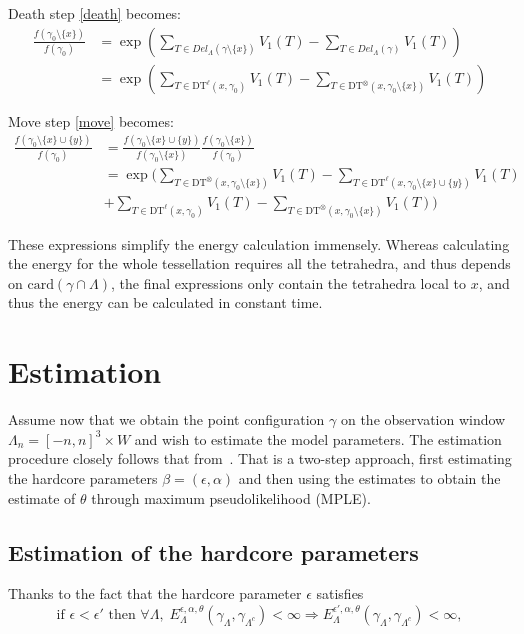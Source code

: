 \documentclass[12pt,a4paper]{report}
\begin{document}
Death step \ref{death} becomes:
\begin{align*}
\frac{f(\gamma_0 \setminus \{x\})}{f(\gamma_0)}&= \exp\left({\sum_{T\in Del_\Lambda(\gamma \setminus \{x\})} V_1(T)- \sum_{T \in Del_\Lambda(\gamma)}V_1(T)}\right)\\
&= \exp\left( \sum_{T\in \text{DT}^\ell (x,\gamma_0)} V_1(T) - \sum_{T \in \text{DT}^\otimes (x,\gamma_0 \setminus \{x\})} V_1(T)   \right)
\end{align*}

Move step \ref{move} becomes:
\begin{align*}
\frac{f(\gamma_0 \setminus \{x\} \cup \{y\})}{f(\gamma_0)}&= 
\frac{f(\gamma_0 \setminus \{x\} \cup \{y\})}{f(\gamma_0\setminus\{x\})} \frac{f(\gamma_0\setminus\{x\})}{f(\gamma_0)} \\ 
&= \exp \Bigg(  \sum_{T \in \text{DT}^\otimes (x,\gamma_0\setminus\{x\})} V_1(T)  - \sum_{T\in \text{DT}^\ell (x,\gamma_0\setminus\{x\}\cup\{y\})} V_1(T)  \\
&+ \sum_{T\in \text{DT}^\ell (x,\gamma_0)} V_1(T) - \sum_{T \in \text{DT}^\otimes (x,\gamma_0\setminus\{x\})} V_1(T)   
\Bigg)
\end{align*}



These expressions simplify the energy calculation immensely. Whereas calculating the energy for the whole tessellation requires all the tetrahedra, and thus depends on $\text{card}(\gamma\cap\Lambda)$, the final expressions only contain the tetrahedra local to $x$, and thus the energy can be calculated in constant time.



\section{Estimation}

Assume now that we obtain the point configuration $\gamma$ on the observation window $\Lambda_n = [-n,n]^3\times W$ and wish to estimate the model parameters.
The estimation procedure closely follows that from~\cite{DL10}. That is a two-step approach, first estimating the hardcore parameters $\beta = (\epsilon,\alpha)$ and then using the estimates to obtain the estimate of $\theta$ through maximum pseudolikelihood (MPLE). 
\subsection{Estimation of the hardcore parameters}
Thanks to the fact that the hardcore parameter $\epsilon$ satisfies
$$ \text{if } \epsilon < \epsilon' \text{ then  } \forall \Lambda, \; E^{\epsilon, \alpha,\theta}_\Lambda(\gamma_\Lambda,\gamma_{\Lambda^c}) < \infty \Rightarrow  E^{\epsilon',\alpha,\theta}_\Lambda(\gamma_\Lambda,\gamma_{\Lambda^c})<\infty,$$ 
\end{document}

